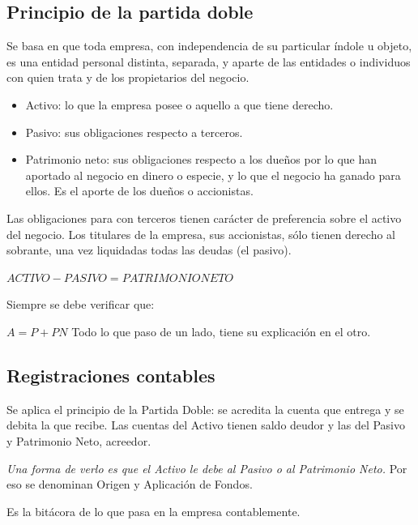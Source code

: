 \documentclass[titlepage,a4paper]{article}
\begin{document}
\subsection{Principio de la partida doble}
Se basa en que toda empresa, con independencia de su particular índole u objeto, es una entidad personal distinta, separada, y aparte de las entidades o individuos con quien trata y de los propietarios del negocio.

\begin{itemize}
    \item Activo: lo que la empresa posee o aquello a que tiene derecho.
    \item Pasivo: sus obligaciones respecto a terceros.
    \item Patrimonio neto: sus obligaciones respecto a los dueños por lo que han aportado al negocio en dinero o especie, y lo que el negocio ha ganado para ellos. Es el aporte de los dueños o accionistas.
\end{itemize}

Las obligaciones para con terceros tienen carácter de preferencia sobre el activo del negocio. Los titulares
de la empresa, sus accionistas, sólo tienen derecho al sobrante, una vez liquidadas todas las deudas (el
pasivo).

\begin{math}
ACTIVO - PASIVO = PATRIMONIO NETO
\end{math}

Siempre se debe verificar que: 

\begin{math}
A = P + PN
\end{math}
Todo lo que paso de un lado, tiene su explicación en el otro.

\subsection{Registraciones contables}
Se aplica el principio de la Partida Doble: se acredita la cuenta que entrega y se
debita la que recibe. Las cuentas del Activo tienen saldo deudor y las del Pasivo y Patrimonio Neto, acreedor. 

\textit{Una forma de verlo es que el Activo le debe al Pasivo o al Patrimonio Neto.} Por eso se denominan Origen y Aplicación de Fondos.

Es la bitácora de lo que pasa en la empresa contablemente.
\end{document}
